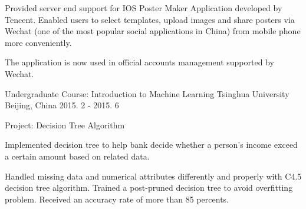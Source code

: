 \begin{cventries}
{\begin{cvitems}
        \item {Provided server end support for IOS Poster Maker Application developed by Tencent. Enabled users to select templates, upload images and share posters via Wechat (one of the most popular social applications in China) from mobile phone more conveniently.}
        \item {The application is now used in official accounts management supported by Wechat.}
      \end{cvitems}
    }
 \cventry
    {Undergraduate Course: Introduction to Machine Learning}
    {Tsinghua University}
    {Beijing, China}
    {2015. 2 - 2015. 6}
    {
      \begin{cvitems}
        \item{Project: Decision Tree Algorithm}
        \item{Implemented decision tree to help bank decide whether a person's income exceed a certain amount based on related data.}
        \item{Handled missing data and numerical attributes differently and properly with C4.5 decision tree algorithm. Trained a post-pruned decision tree to avoid overfitting problem. Received an accuracy rate of more than 85 percents.}
      \end{cvitems}
    }


\end{cventries}
